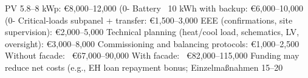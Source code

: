\markdownRendererUlItem PV 5.8–8 kWp: €8,000–12,000 (0- Battery ~10 kWh with backup: €6,000–10,000 (0- Critical-loads subpanel + transfer: €1,500–3,000\markdownRendererUlItemEnd 
\markdownRendererUlEndTight \markdownRendererInterblockSeparator
{}
\markdownRendererSectionEnd \markdownRendererSectionBegin
{}\markdownRendererInterblockSeparator
{}\markdownRendererUlBeginTight
\markdownRendererUlItem EEE (confirmations, site supervision): €2,000–5,000\markdownRendererUlItemEnd 
\markdownRendererUlItem Technical planning (heat/cool load, schematics, LV, oversight): €3,000–8,000\markdownRendererUlItemEnd 
\markdownRendererUlItem Commissioning and balancing protocols: €1,000–2,500\markdownRendererUlItemEnd 
\markdownRendererUlEndTight \markdownRendererInterblockSeparator
{}
\markdownRendererSectionEnd \markdownRendererSectionBegin
{}\markdownRendererInterblockSeparator
{}\markdownRendererUlBeginTight
\markdownRendererUlItem Without facade: ~€67,000–90,000\markdownRendererUlItemEnd 
\markdownRendererUlItem With facade: ~€82,000–115,000\markdownRendererUlItemEnd 
\markdownRendererUlEndTight \markdownRendererInterblockSeparator
{}Funding may reduce net costs (e.g., EH loan repayment bonus; Einzelmaßnahmen 15–20
\markdownRendererSectionEnd 
\markdownRendererSectionEnd \markdownRendererDocumentEnd
